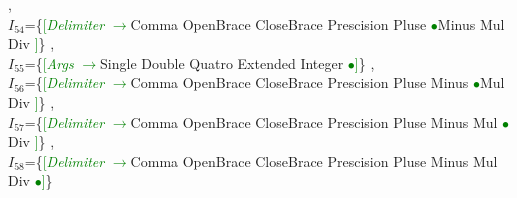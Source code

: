 \documentclass[a0]{a0poster}
\begin{document}
,\\
$I_{54}$=\{\textcolor{Green}{[}\textcolor{Green}{\textit{Delimiter}} \textcolor{Green}{$\to$}Comma OpenBrace CloseBrace Prescision Pluse \textcolor{Green}{$\bullet$}Minus Mul Div \textcolor{Green}{]}\}
,\\
$I_{55}$=\{\textcolor{Green}{[}\textcolor{Green}{\textit{Args}} \textcolor{Green}{$\to$}Single Double Quatro Extended Integer \textcolor{Green}{$\bullet$}\textcolor{Green}{]}\}
,\\
$I_{56}$=\{\textcolor{Green}{[}\textcolor{Green}{\textit{Delimiter}} \textcolor{Green}{$\to$}Comma OpenBrace CloseBrace Prescision Pluse Minus \textcolor{Green}{$\bullet$}Mul Div \textcolor{Green}{]}\}
,\\
$I_{57}$=\{\textcolor{Green}{[}\textcolor{Green}{\textit{Delimiter}} \textcolor{Green}{$\to$}Comma OpenBrace CloseBrace Prescision Pluse Minus Mul \textcolor{Green}{$\bullet$}Div \textcolor{Green}{]}\}
,\\
$I_{58}$=\{\textcolor{Green}{[}\textcolor{Green}{\textit{Delimiter}} \textcolor{Green}{$\to$}Comma OpenBrace CloseBrace Prescision Pluse Minus Mul Div \textcolor{Green}{$\bullet$}\textcolor{Green}{]}\}
\end{document}
